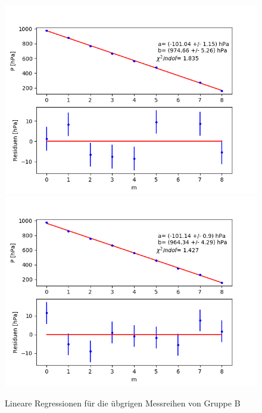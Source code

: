 \documentclass[12pt,a4paper]{article}
\begin{document}
\begin{figure}[H]
\includegraphics[scale=0.5]{Bilder/Druck_B_Var2_6.png}
\includegraphics[scale=0.5]{Bilder/Druck_B_Var2_7.png}
\caption{Lineare Regressionen für die übgrigen Messreihen von Gruppe B}
\end{figure}
\end{document}
